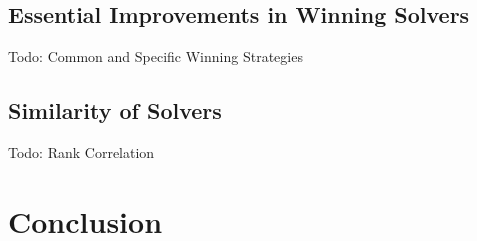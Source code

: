 \documentclass{elsarticle}
\newcommand{\todo}[1]{{\color{purple}Todo: #1}}
\begin{document}
\subsection{Essential Improvements in Winning Solvers}

\todo{Common and Specific Winning Strategies}

\subsection{Similarity of Solvers}

\todo{Rank Correlation}


\section{Conclusion}





\end{document}
